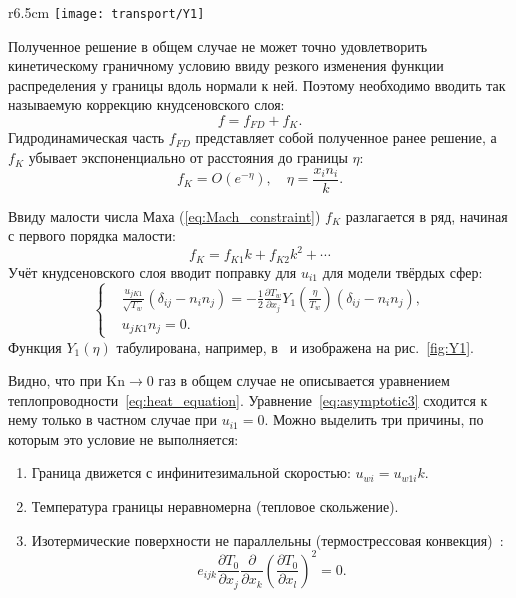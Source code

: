 \documentclass[english,russian,a4paper,10pt]{article}
\newcommand{\Kn}{\mathrm{Kn}}
\newcommand{\pder}[2][]{\frac{\partial#1}{\partial#2}}
\begin{document}
\begin{wrapfigure}{r}{6.5cm}
	\vspace{-10pt}
	\texttt{[image: transport/Y1]}
	\vspace{-20pt}
	\caption{Функция \(Y_1(\eta)\) кнудсеновского слоя для модели твёрдых сфер}\label{fig:Y1}
	\vspace{5pt}
\end{wrapfigure}

Полученное решение в общем случае не может точно удовлетворить кинетическому граничному условию
ввиду резкого изменения функции распределения у границы вдоль нормали к ней.
Поэтому необходимо вводить так называемую коррекцию кнудсеновского слоя:
\begin{equation}
	f = f_{FD} + f_K.
\end{equation}
Гидродинамическая часть \(f_{FD}\) представляет собой полученное ранее решение,
а \(f_K\) убывает экспоненциально от расстояния до границы \(\eta\):
\begin{equation}
	f_K = O\left(e^{-\eta}\right), \quad \eta = \frac{x_in_i}k.
\end{equation}

Ввиду малости числа Маха (\ref{eq:Mach_constraint}) \(f_K\) разлагается в ряд, начиная с первого порядка малости:
\[ f_K = f_{K1}k + f_{K2}k^2 + \cdots \]
Учёт кнудсеновского слоя вводит поправку для \(u_{i1}\) для модели твёрдых сфер:
\begin{equation}
	\left\{
	\begin{aligned}
		& \frac{u_{jK1}}{\sqrt{T_w}}(\delta_{ij}-n_in_j) = 
			-\frac12\pder[T_w]{x_j} Y_1\left(\frac\eta{T_w}\right) (\delta_{ij}-n_in_j), \\
		& u_{jK1}n_j = 0.
	\end{aligned}
	\right. \label{eq:bound:v_K}
\end{equation}
Функция \(Y_1(\eta)\) табулирована, например, в~\cite{Sone2002, Sone2007} и изображена на рис.~\ref{fig:Y1}.

Видно, что при \(\Kn\to0\) газ в общем случае не описывается уравнением теплопроводности~\eqref{eq:heat_equation}.
Уравнение~\eqref{eq:asymptotic3} сходится к нему только в частном случае при \(u_{i1} = 0\).
Можно выделить три причины, по которым это условие не выполняется:
\begin{enumerate}
	\item Граница движется с инфинитезимальной скоростью: \(u_{wi} = u_{w1i}k\).
	\item Температура границы неравномерна (тепловое скольжение).
	\item Изотермические поверхности не параллельны (термострессовая конвекция)~\cite{Kogan1976}:
		\begin{equation}\label{eq:equilibrium}
			e_{ijk}\pder[T_0]{x_j}\pder{x_k}\left(\pder[T_0]{x_l}\right)^2 = 0.
		\end{equation}
\end{enumerate}
\end{document}
